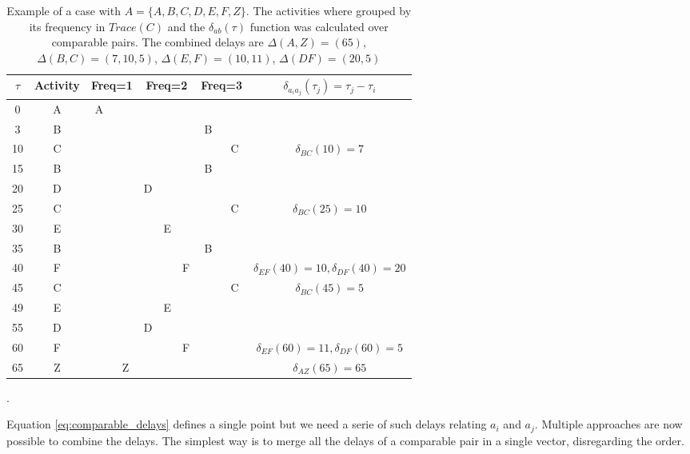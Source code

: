 \documentclass{article}
\begin{document}
\begin{table}[h]
\centering
\begin{tabular}{||c c||c c||c c c||c c||c||} 
 \hline
 $\tau$ & Activity & \multicolumn{2}{|c||}{Freq=1} & \multicolumn{3}{|c||}{Freq=2} & \multicolumn{2}{|c||}{Freq=3} & $\delta_{a_i a_j}(\tau_j)=\tau_j - \tau_i$ \\
 \hline\hline
 0  & A & A &   &   &   &   &   &   & \\
 \hline
 3  & B &   &   &   &   &   & B &   & \\
 \hline
 10 & C &   &   &   &   &   &   & C & $\delta_{BC}(10)=7$ \\
 \hline
 15 & B &   &   &   &   &   & B &   & \\
 \hline
 20 & D &   &   & D &   &   &   &   & \\
 \hline
 25 & C &   &   &   &   &   &   & C & $\delta_{BC}(25)=10$ \\
 \hline
 30 & E &   &   &   & E &   &   &   & \\
 \hline
 35 & B &   &   &   &   &   & B &   & \\
 \hline
 40 & F &   &   &   &   & F &   &   & $\delta_{EF}(40)=10, \delta_{DF}(40)=20$ \\
 \hline
 45 & C &   &   &   &   &   &   & C & $\delta_{BC}(45)=5$ \\
 \hline
 49 & E &   &   &   & E &   &   &   & \\
 \hline
 55 & D &   &   & D &   &   &   &   & \\
 \hline
 60 & F &   &   &   &   & F &   &   & $\delta_{EF}(60)=11, \delta_{DF}(60)=5$ \\
 \hline
 65 & Z &   & Z &   &   &   &   &   & $\delta_{AZ}(65)=65$ \\
 \hline
\end{tabular}
\caption{Example of a case with $A = \{ A, B, C, D, E, F, Z \}$. The activities where grouped by its frequency in $Trace(C)$ and the $\delta_{ab}(\tau)$ function was calculated over comparable pairs. The combined delays are $\Delta(A,Z)=(65)$, $\Delta(B,C)=(7,10,5)$, $\Delta(E,F)=(10,11)$, $\Delta(DF)=(20,5)$}.
\label{table:case_example}
\end{table}

Equation \ref{eq:comparable_delays} defines a single point but we need a serie of such delays relating $a_i$ and $a_j$. Multiple approaches are now possible to combine the delays. The simplest way is to merge all the delays of a comparable pair in a single vector, disregarding the order.
\end{document}
